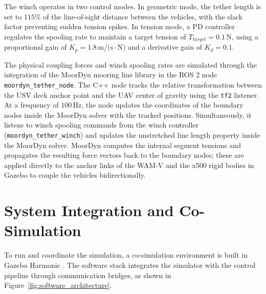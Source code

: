     The winch operates in two control modes. In geometric mode, the tether length is set to $115\%$ of the line-of-sight distance between the vehicles, with the slack factor preventing sudden tension spikes. In tension mode, a PD controller regulates the spooling rate to maintain a target tension of $T_{target} = 0.1\,\text{N}$, using a proportional gain of $K_p = 1.8\,\text{m/(s}\cdot\text{N)}$ and a derivative gain of $K_d = 0.1$.
    
    The physical coupling forces and winch spooling rates are simulated through the integration of the MoorDyn mooring line library in the ROS 2 node \texttt{moordyn\_tether\_node}. The C++ node tracks the relative transformation between the USV deck anchor point and the UAV center of gravity using the \texttt{tf2} listener. At a frequency of $100\,\text{Hz}$, the node updates the coordinates of the boundary nodes inside the MoorDyn solver with the tracked positions. Simultaneously, it listens to winch spooling commands from the winch controller (\texttt{moordyn\_tether\_winch}) and updates the unstretched line length property inside the MoorDyn solver. MoorDyn computes the internal segment tensions and propagates the resulting force vectors back to the boundary nodes; these are applied directly to the anchor links of the WAM-V and the x500 rigid bodies in Gazebo to couple the vehicles bidirectionally.

\section{System Integration and Co-Simulation}
\label{sec:system_data_flow}

To run and coordinate the simulation, a co-simulation environment is built in Gazebo Harmonic \cite{koenig2004gazebo}. The software stack integrates the simulator with the control pipeline through communication bridges, as shown in Figure~\ref{fig:software_architecture}.

